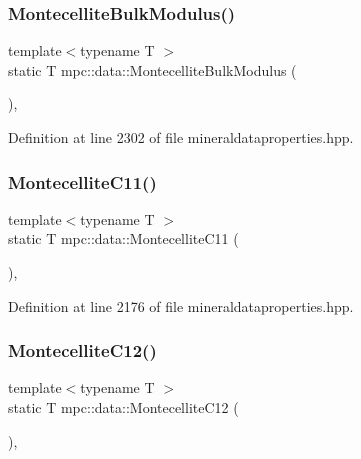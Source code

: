 \subsubsection{\texorpdfstring{Montecellite\+Bulk\+Modulus()}{MontecelliteBulkModulus()}}
{\footnotesize\ttfamily template$<$typename T $>$ \\
static T mpc\+::data\+::\+Montecellite\+Bulk\+Modulus (\begin{DoxyParamCaption}{ }\end{DoxyParamCaption})\hspace{0.3cm}{\ttfamily [inline]}, {\ttfamily [static]}}



Definition at line 2302 of file mineraldataproperties.\+hpp.

\mbox{\label{namespacempc_1_1data_a1cd73c4326e9150c9b59ea2655f2dc4e}} 
\subsubsection{\texorpdfstring{Montecellite\+C11()}{MontecelliteC11()}}
{\footnotesize\ttfamily template$<$typename T $>$ \\
static T mpc\+::data\+::\+Montecellite\+C11 (\begin{DoxyParamCaption}{ }\end{DoxyParamCaption})\hspace{0.3cm}{\ttfamily [inline]}, {\ttfamily [static]}}



Definition at line 2176 of file mineraldataproperties.\+hpp.

\mbox{\label{namespacempc_1_1data_af9f57609c1ab351fd999e9d231d94a8c}} 
\subsubsection{\texorpdfstring{Montecellite\+C12()}{MontecelliteC12()}}
{\footnotesize\ttfamily template$<$typename T $>$ \\
static T mpc\+::data\+::\+Montecellite\+C12 (\begin{DoxyParamCaption}{ }\end{DoxyParamCaption})\hspace{0.3cm}{\ttfamily [inline]}, {\ttfamily [static]}}



